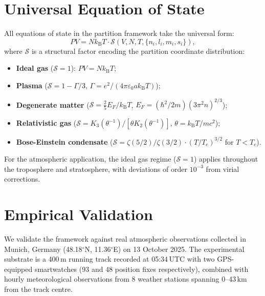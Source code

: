 \documentclass[twocolumn,10pt]{article}
\theoremstyle{definition}
\newcommand{\kB}{k_{\mathrm{B}}}
\begin{document}
\section{Universal Equation of State}\label{sec:eos}

All equations of state in the partition framework take the universal form:
\begin{equation}\label{eq:universal_eos}
    PV = N\kB T \cdot \mathcal{S}(V, N, T, \{n_i, l_i, m_i, s_i\}),
\end{equation}
where $\mathcal{S}$ is a structural factor encoding the partition coordinate distribution:

\begin{itemize}[nosep]
    \item \textbf{Ideal gas} ($\mathcal{S} = 1$): $PV = N\kB T$;
    \item \textbf{Plasma} ($\mathcal{S} = 1 - \Gamma/3$, $\Gamma = e^2/(4\pi\varepsilon_0 a\kB T)$);
    \item \textbf{Degenerate matter} ($\mathcal{S} = \frac{2}{5}E_F/\kB T$, $E_F = (\hbar^2/2m)(3\pi^2 n)^{2/3}$);
    \item \textbf{Relativistic gas} ($\mathcal{S} = K_3(\theta^{-1})/[\theta K_2(\theta^{-1})]$, $\theta = \kB T/mc^2$);
    \item \textbf{Bose-Einstein condensate} ($\mathcal{S} = \zeta(5/2)/\zeta(3/2) \cdot (T/T_c)^{3/2}$ for $T < T_c$).
\end{itemize}

For the atmospheric application, the ideal gas regime ($\mathcal{S} = 1$) applies throughout the troposphere and stratosphere, with deviations of order $10^{-3}$ from virial corrections.

\section{Empirical Validation}\label{sec:validation}

We validate the framework against real atmospheric observations collected in Munich, Germany (48.18$^\circ$N, 11.36$^\circ$E) on 13 October 2025. The experimental substrate is a 400\,m running track recorded at 05:34\,UTC with two GPS-equipped smartwatches (93 and 48 position fixes respectively), combined with hourly meteorological observations from 8 weather stations spanning 0--43\,km from the track centre.
\end{document}
